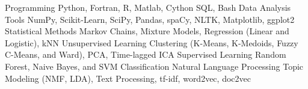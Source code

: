 
\begin{cvskills}
    \cvskill
        {Programming}
        {Python, Fortran, R, Matlab, Cython SQL, Bash}
    \cvskill
        {Data Analysis Tools}
        {NumPy, Scikit-Learn, SciPy, Pandas, spaCy, NLTK, Matplotlib, ggplot2}
    \cvskill
    	{Statistical Methods}
	    {Markov Chains, Mixture Models, Regression (Linear and Logistic), kNN}
    \cvskill
        {Unsupervised Learning}
        {Clustering (K-Means, K-Medoids, Fuzzy C-Means, and Ward), PCA, Time-lagged ICA}
    \cvskill
        {Supervised Learning}
        {Random Forest, Naive Bayes, and SVM Classification}
    \cvskill
        {Natural Language Processing}
        {Topic Modeling (NMF, LDA), Text Processing, tf-idf, word2vec, doc2vec}
\end{cvskills}
